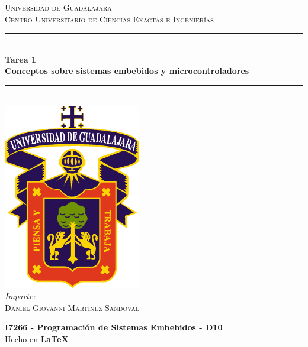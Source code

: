 \documentclass[11pt,letterpaper]{article}
\newcommand{\HRule}{\rule{\linewidth}{0.5mm}} %
\begin{document}

\begin{titlepage}
    \center
    
    \textsc{\LARGE Universidad de Guadalajara}\\[0.2cm] %
    \textsc{Centro Universitario de Ciencias Exactas e Ingenierías}\\[1cm]
    
    \HRule \\[0.3cm]
    { 
        \LARGE \textbf{Tarea 1} \\[0.3cm]
        \large \textbf{Conceptos sobre sistemas embebidos y microcontroladores} \\[0.3cm]
    }
    \HRule \\[2cm]
    
    \includegraphics[width=6cm]{logo_udg_color.eps}\\[1.25cm] %
    
    \center
    \vspace{1cm}
    \emph{Imparte:} \\ %
    \textsc{Daniel Giovanni Martínez Sandoval} 
    
    \vfill
    \textbf{I7266 - Programación de Sistemas Embebidos - D10} \\
    Hecho en \textbf{\LaTeX}	
\end{titlepage}



\end{document}
